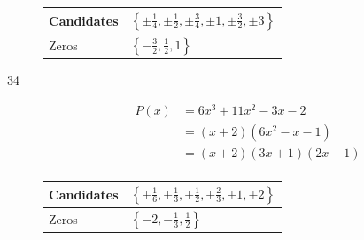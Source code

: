 \documentclass{exam}
\begin{document}
\begin{description}
        \begin{tabular}{ll}
          \toprule
          Candidates & $\left\{ \pm \frac{1}{4}, \pm \frac{1}{2}, \pm \frac{3}{4}, \pm 1, \pm \frac{3}{2}, \pm 3 \right\}$ \\
          \midrule
          Zeros      & $\left\{ -\frac{3}{2}, \frac{1}{2}, 1 \right\}$ \\
          \bottomrule
        \end{tabular}

        \vspace{.5 cm}

   

      \item[34]
        \begin{align*}
          P(x) &= 6x^3 + 11x^2 - 3x - 2 \\
               &= (x + 2)(6x^2 - x - 1) \\
               &= (x + 2)(3x + 1)(2x - 1) \\
        \end{align*}

        \begin{tabular}{ll}
          \toprule
          Candidates & $\left\{ \pm \frac{1}{6}, \pm \frac{1}{3}, \pm \frac{1}{2}, \pm \frac{2}{3}, \pm 1, \pm 2 \right\}$ \\
          \midrule
          Zeros      & $\left\{  -2, -\frac{1}{3}, \frac{1}{2} \right\}$ \\
          \bottomrule
        \end{tabular}


\end{description}
\end{document}
